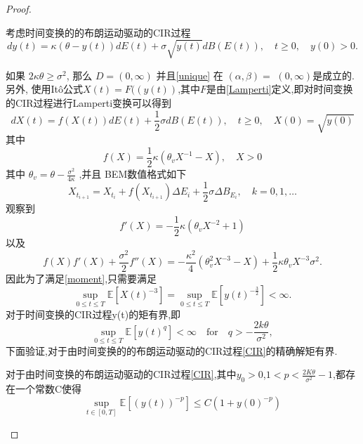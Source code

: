 \begin{proof}
	\begin{example}
		考虑时间变换的的布朗运动驱动的CIR过程
		\begin{equation}\label{CIR}
			dy(t)=\kappa(\theta-y(t))dE(t)+\sigma\sqrt{y(t)}dB(E(t)),\quad t\geq0,\quad y(0)>0.
		\end{equation}
	\end{example}
	如果 $2\kappa\theta\geq\sigma^{2}$, 那么 $D=(0,\infty)$ 并且\cref{unique} 在 $(\alpha,\beta)=$
	$(0,\infty)$是成立的. 
	另外, 使用It\^{o}公式$X(t)=F((y(t))$,其中$F$是由\cref{Lamperti}定义,即对时间变换的CIR过程进行Lamperti变换可以得到
	\begin{equation}
		dX(t)=f(X(t))dE(t)+\frac12\sigma dB(E(t)),\quad t\geq0,\quad X(0)=\sqrt{y(0)}
	\end{equation}
	其中
	\begin{equation}
		f(X)=\dfrac{1}{2}\kappa\left(\theta_vX^{-1}-X\right),\quad X>0
	\end{equation}
	其中 $\theta_v=\theta-\frac{\sigma^2}{4\kappa}$ ,并且 BEM数值格式如下
	\begin{equation}
		X_{t_{i+1}}=X_{t_{i}}+f(X_{t_{i+1}})\Delta E_i+\frac{1}{2}\sigma\Delta B_{E_i},\quad k=0,1,\dots 
	\end{equation}
	观察到
	\begin{equation}
		f'(X)=-\frac{1}{2}\kappa(\theta_vX^{-2}+1)
	\end{equation}
	以及
	\begin{equation}
		f(X)f'(X)+\frac{\sigma^2}{2}f''(X)=-\frac{\kappa^2}{4}(\theta_v^2X^{-3}-X)+\frac{1}{2}\kappa\theta_vX^{-3}\sigma^2.
	\end{equation}
	因此为了满足\cref{moment},只需要满足
	\begin{equation}
		\sup_{0\leq t\leq T}\mathbb{E}[X(t)^{-3}]=\sup_{0\leq t\leq T}\mathbb{E}[y(t)^{-\frac{3}{2}}] < \infty.
	\end{equation}
	对于时间变换的CIR过程y(t)的矩有界,即
	\begin{equation}
		\sup\limits_{0\leq t\leq T}\mathbb{E}[y(t)^q]<\infty\quad\mathrm{for}\quad q>-\frac{2k\theta}{\sigma^2},
	\end{equation}
	下面验证,对于由时间变换的的布朗运动驱动的CIR过程\cref{CIR}的精确解矩有界.
	\begin{proposition}
		对于由时间变换的布朗运动驱动的CIR过程\cref{CIR},其中$y_0>0$,$1<p<\frac{2K\theta}{\sigma^2}-1$,都存在一个常数C使得
		\begin{equation*}
			\sup\limits_{t\in[0,T]}\mathbb{E}\left[\left(y(t)\right)^{-p}\right]\leq C(1+y(0)^{-p})
		\end{equation*}

\end{proposition}
\end{proof}
